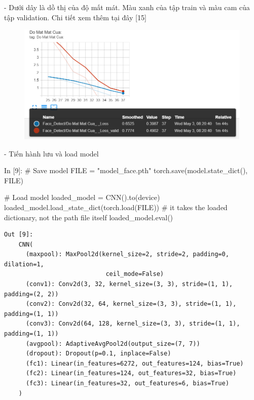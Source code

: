 \documentclass[12pt, a4paper]{article}
\begin{document}
\par - Dưới dây là dồ thị của độ mất mát. Màu xanh của tập train và màu cam của tập validation. Chi tiết xem thêm tại đây [15]
\begin{figure}[h] %
    \centering
    \includegraphics[scale = 0.65]{Img/Face/P3.png}
\end{figure}
\par - Tiến hành lưu và load model 
\begin{python}
In [9]: # Save model
        FILE = "model_face.pth"
        torch.save(model.state_dict(), FILE)
        
        # Load model
        loaded_model = CNN().to(device)
        loaded_model.load_state_dict(torch.load(FILE)) # it takes the loaded dictionary, not the path file itself
        loaded_model.eval()
\end{python}
\newpage
\begin{verbatim}
Out [9]:
    CNN(
      (maxpool): MaxPool2d(kernel_size=2, stride=2, padding=0, dilation=1, 
                            ceil_mode=False)
      (conv1): Conv2d(3, 32, kernel_size=(3, 3), stride=(1, 1), padding=(2, 2))
      (conv2): Conv2d(32, 64, kernel_size=(3, 3), stride=(1, 1), padding=(1, 1))
      (conv3): Conv2d(64, 128, kernel_size=(3, 3), stride=(1, 1), padding=(1, 1))
      (avgpool): AdaptiveAvgPool2d(output_size=(7, 7))
      (dropout): Dropout(p=0.1, inplace=False)
      (fc1): Linear(in_features=6272, out_features=124, bias=True)
      (fc2): Linear(in_features=124, out_features=32, bias=True)
      (fc3): Linear(in_features=32, out_features=6, bias=True)
    )
\end{verbatim}
\end{document}
